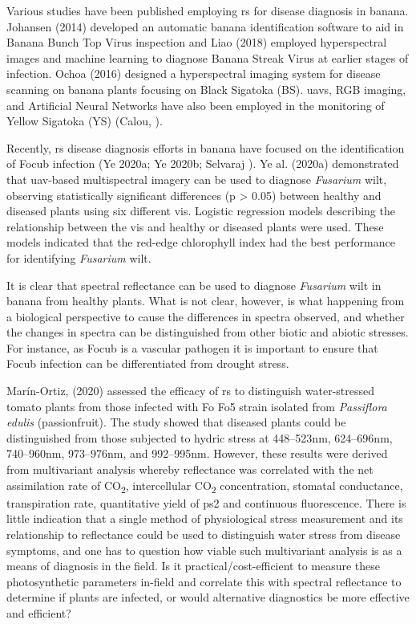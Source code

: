 Various studies have been published employing \ac{rs} for disease diagnosis in banana. Johansen \et (2014) developed an automatic banana identification software to aid in Banana Bunch Top Virus inspection and Liao \et (2018) employed hyperspectral images and machine learning to diagnose Banana Streak Virus at earlier stages of infection. Ochoa \et (2016) designed a hyperspectral imaging system for disease scanning on banana plants focusing on Black Sigatoka (BS). \ac{uavs}, RGB imaging, and Artificial Neural Networks have also been employed in the monitoring of Yellow Sigatoka (YS) (Calou, ).  

Recently, \ac{rs} disease diagnosis efforts in banana have focused on the identification of \ac{Focub} infection (Ye \et 2020a; Ye \et 2020b; Selvaraj ). Ye \et al. (2020a) demonstrated that \ac{uav}-based multispectral imagery can be used to diagnose \textit{Fusarium} wilt, observing statistically significant differences (p > 0.05) between healthy and diseased plants using six different \acp{vi}. Logistic regression models describing the relationship between the \acp{vi} and healthy or diseased plants were used. These models indicated that the red-edge chlorophyll index had the best performance for identifying \textit{Fusarium} wilt.  

It is clear that spectral reflectance can be used to diagnose \textit{Fusarium} wilt in banana from healthy plants. What is not clear, however, is what happening from a biological perspective to cause the differences in spectra observed, and whether the changes in spectra can be distinguished from other biotic and abiotic stresses. For instance, as \ac{Focub} is a vascular pathogen it is important to ensure that \ac{Focub} infection can be differentiated from drought stress.   

Marín-Ortiz, \et (2020) assessed the efficacy of \ac{rs} to distinguish water-stressed tomato plants from those infected with \ac{Fo} Fo5 strain isolated from \textit{Passiflora edulis }(passionfruit). The study showed that diseased plants could be distinguished from those subjected to hydric stress at 448–523nm, 624–696nm, 740–960nm, 973–976nm, and 992–995nm. However, these results were derived from multivariant analysis whereby reflectance was correlated with the net assimilation rate of CO\textsubscript{2}, intercellular CO\textsubscript{2} concentration, stomatal conductance, transpiration rate, quantitative yield of \ac{ps2} and continuous fluorescence. There is little indication that a single method of physiological stress measurement and its relationship to reflectance could be used to distinguish water stress from disease symptoms, and one has to question how viable such multivariant analysis is as a means of diagnosis in the field. Is it practical/cost-efficient to measure these photosynthetic parameters in-field and correlate this with spectral reflectance to determine if plants are infected, or would alternative diagnostics be more effective and efficient?   

